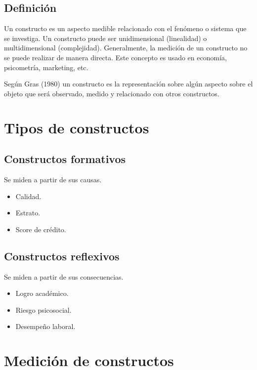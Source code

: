 \documentclass[
  letterpaper,
  DIV=11,
  numbers=noendperiod]{scrreprt}
\providecommand{\tightlist}{%
  \setlength{\itemsep}{0pt}\setlength{\parskip}{0pt}}\usepackage{longtable,booktabs,array}
\begin{document}
\subsection{Definición}\label{definiciuxf3n}

Un constructo es un aspecto medible relacionado con el fenómeno o
sistema que se investiga. Un constructo puede ser unidimensional
(linealidad) o multidimensional (complejidad). Generalmente, la medición
de un constructo no se puede realizar de manera directa. Este concepto
es usado en economía, psicometría, marketing, etc.

Según Gras (1980) un constructo es la representación sobre algún aspecto
sobre el objeto que será observado, medido y relacionado con otros
constructos.

\section{Tipos de constructos}\label{tipos-de-constructos}

\subsection{Constructos formativos}\label{constructos-formativos}

Se miden a partir de sus causas.

\begin{itemize}
\tightlist
\item
  Calidad.
\item
  Estrato.
\item
  Score de crédito.
\end{itemize}

\subsection{Constructos reflexivos}\label{constructos-reflexivos}

Se miden a partir de sus consecuencias.

\begin{itemize}
\tightlist
\item
  Logro académico.
\item
  Riesgo psicosocial.
\item
  Desempeño laboral.
\end{itemize}

\section{Medición de constructos}\label{mediciuxf3n-de-constructos}
\end{document}
